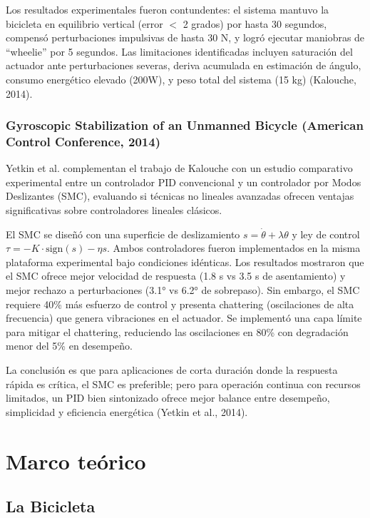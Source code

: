 \documentclass[12pt,letterpaper]{report}
\begin{document}
Los resultados experimentales fueron contundentes: el sistema mantuvo la bicicleta en equilibrio vertical (error $<$ 2 grados) por hasta 30 segundos, compensó perturbaciones impulsivas de hasta 30 N, y logró ejecutar maniobras de ``wheelie'' por 5 segundos. Las limitaciones identificadas incluyen saturación del actuador ante perturbaciones severas, deriva acumulada en estimación de ángulo, consumo energético elevado (200W), y peso total del sistema (15 kg) (Kalouche, 2014).

\subsubsection{Gyroscopic Stabilization of an Unmanned Bicycle (American Control Conference, 2014)}

Yetkin et al. complementan el trabajo de Kalouche con un estudio comparativo experimental entre un controlador PID convencional y un controlador por Modos Deslizantes (SMC), evaluando si técnicas no lineales avanzadas ofrecen ventajas significativas sobre controladores lineales clásicos.

El SMC se diseñó con una superficie de deslizamiento $s = \dot{\theta} + \lambda\theta$ y ley de control $\tau = -K \cdot \text{sign}(s) - \eta s$. Ambos controladores fueron implementados en la misma plataforma experimental bajo condiciones idénticas. Los resultados mostraron que el SMC ofrece mejor velocidad de respuesta (1.8 s vs 3.5 s de asentamiento) y mejor rechazo a perturbaciones (3.1° vs 6.2° de sobrepaso). Sin embargo, el SMC requiere 40\% más esfuerzo de control y presenta chattering (oscilaciones de alta frecuencia) que genera vibraciones en el actuador. Se implementó una capa límite para mitigar el chattering, reduciendo las oscilaciones en 80\% con degradación menor del 5\% en desempeño.

La conclusión es que para aplicaciones de corta duración donde la respuesta rápida es crítica, el SMC es preferible; pero para operación continua con recursos limitados, un PID bien sintonizado ofrece mejor balance entre desempeño, simplicidad y eficiencia energética (Yetkin et al., 2014).

\section{Marco teórico}

\subsection{La Bicicleta}
\end{document}
